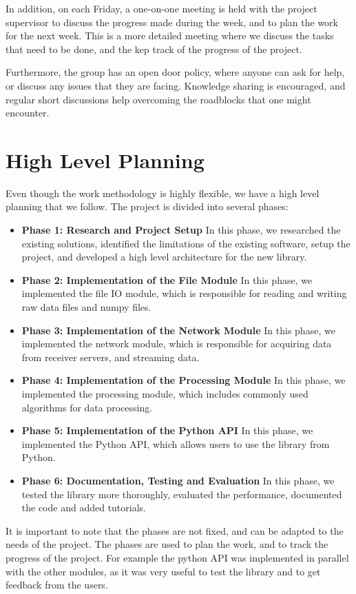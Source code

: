 \begin{spacing}{1.2}
    In addition, on each Friday, a one-on-one meeting is held with the project supervisor to discuss the progress made during the week,
    and to plan the work for the next week. This is a more detailed meeting where we discuss the tasks that need to be done, and the
    kep track of the progress of the project.

    Furthermore, the group has an open door policy, where anyone can ask for help, or discuss any issues that they are facing.
    Knowledge sharing is encouraged, and regular short discussions help overcoming the roadblocks that one might encounter.
    \section{High Level Planning}
    Even though the work methodology is highly flexible, we have a high level planning that we follow.
    The project is divided into several phases:
    \begin{itemize}
        \item \textbf{Phase 1: Research and Project Setup} In this phase, we researched the existing solutions, identified the limitations of the existing software,
              setup the project, and developed a high level architecture for the new library.
        \item \textbf{Phase 2: Implementation of the File Module} In this phase, we implemented the file IO module, which is responsible for reading and writing raw data files and numpy files.
        \item \textbf{Phase 3: Implementation of the Network Module} In this phase, we implemented the network module, which is responsible for acquiring data from receiver servers, and streaming data.
        \item \textbf{Phase 4: Implementation of the Processing Module} In this phase, we implemented the processing module, which includes commonly used algorithms for data processing.
        \item \textbf{Phase 5: Implementation of the Python API} In this phase, we implemented the Python API, which allows users to use the library from Python.
        \item \textbf{Phase 6: Documentation, Testing and Evaluation} In this phase, we tested the library more thoroughly, evaluated the performance, documented the code and added tutorials.
    \end{itemize}

    It is important to note that the phases are not fixed, and can be adapted to the needs of the project. The phases are used to plan the work, and to track the progress of the project.
    For example the python API was implemented in parallel with the other modules, as it was very useful to test the library and to get feedback from the users.


\end{spacing}
